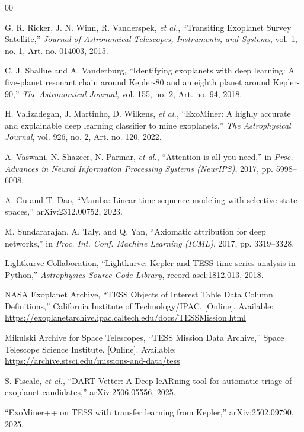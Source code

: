 \documentclass[conference]{IEEEtran}
\newcommand{\etal}{\textit{et al.}}
\begin{document}
\begin{thebibliography}{00}

G. R. Ricker, J. N. Winn, R. Vanderspek, \etal, ``Transiting Exoplanet Survey Satellite,'' \textit{Journal of Astronomical Telescopes, Instruments, and Systems}, vol. 1, no. 1, Art. no. 014003, 2015.

C. J. Shallue and A. Vanderburg, ``Identifying exoplanets with deep learning: A five-planet resonant chain around Kepler-80 and an eighth planet around Kepler-90,'' \textit{The Astronomical Journal}, vol. 155, no. 2, Art. no. 94, 2018.

H. Valizadegan, J. Martinho, D. Wilkens, \etal, ``ExoMiner: A highly accurate and explainable deep learning classifier to mine exoplanets,'' \textit{The Astrophysical Journal}, vol. 926, no. 2, Art. no. 120, 2022.

A. Vaswani, N. Shazeer, N. Parmar, \etal, ``Attention is all you need,'' in \textit{Proc. Advances in Neural Information Processing Systems (NeurIPS)}, 2017, pp. 5998--6008.

A. Gu and T. Dao, ``Mamba: Linear-time sequence modeling with selective state spaces,'' arXiv:2312.00752, 2023.

M. Sundararajan, A. Taly, and Q. Yan, ``Axiomatic attribution for deep networks,'' in \textit{Proc. Int. Conf. Machine Learning (ICML)}, 2017, pp. 3319--3328.

Lightkurve Collaboration, ``Lightkurve: Kepler and TESS time series analysis in Python,'' \textit{Astrophysics Source Code Library}, record ascl:1812.013, 2018.

NASA Exoplanet Archive, ``TESS Objects of Interest Table Data Column Definitions,'' California Institute of Technology/IPAC. [Online]. Available: \url{https://exoplanetarchive.ipac.caltech.edu/docs/TESSMission.html}

Mikulski Archive for Space Telescopes, ``TESS Mission Data Archive,'' Space Telescope Science Institute. [Online]. Available: \url{https://archive.stsci.edu/missions-and-data/tess}

S. Fiscale, \etal, ``DART-Vetter: A Deep leARning tool for automatic triage of exoplanet candidates,'' arXiv:2506.05556, 2025.

``ExoMiner++ on TESS with transfer learning from Kepler,'' arXiv:2502.09790, 2025.

\end{thebibliography}
\end{document}
